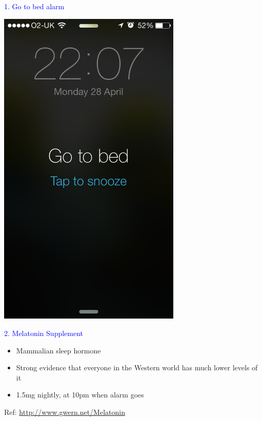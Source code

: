\documentclass[landscape]{slides}
\begin{document}
\begin{slide}

    \textcolor{blue}{\Large{1. Go to bed alarm}}

    \begin{center}
        \includegraphics[height=15.5cm]{go-to-bed-alarm}
    \end{center}

\end{slide}


\begin{slide}

    \textcolor{blue}{\Large{2. Melatonin Supplement}}

    \begin{itemize}
        \item Mammalian sleep hormone
        \item Strong evidence that everyone in the Western world has much lower levels of it
        \item 1.5mg nightly, at 10pm when alarm goes
    \end{itemize}

    \small{Ref: \url{http://www.gwern.net/Melatonin}}

\end{slide}
\end{document}
